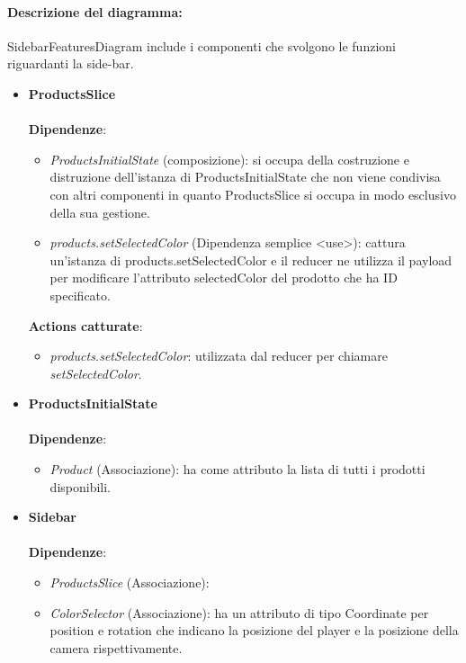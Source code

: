 	\paragraph*{Descrizione del diagramma:}
	SidebarFeaturesDiagram include i componenti che svolgono le funzioni riguardanti la side-bar.
\begin{itemize}
		\item \textbf{ProductsSlice}
		\\\\
		\textbf{Dipendenze}:
		\begin{itemize}
			\item \textit{ProductsInitialState} (composizione): si occupa della costruzione e distruzione dell'istanza di ProductsInitialState
			che non viene condivisa con altri componenti in quanto ProductsSlice si occupa in modo esclusivo della sua gestione.
			\item \textit{products.setSelectedColor} (Dipendenza semplice \textless use\textgreater): cattura un'istanza di products.setSelectedColor e il 
			reducer ne utilizza il payload per modificare l'attributo selectedColor del prodotto che ha ID specificato.
		\end{itemize}
		\textbf{Actions catturate}:
		\begin{itemize}
			\item \textit{products.setSelectedColor}: utilizzata dal reducer per chiamare \textit{setSelectedColor}.
		\end{itemize}
		\item \textbf{ProductsInitialState}
		\\\\
		\textbf{Dipendenze}:
		\begin{itemize}
			\item \textit{Product} (Associazione): ha come attributo la lista di tutti i prodotti disponibili.
		\end{itemize}
		\item \textbf{Sidebar}
		\\\\
		\textbf{Dipendenze}:
		\begin{itemize}
			\item \textit{ProductsSlice} (Associazione):
			\item \textit{ColorSelector} (Associazione): ha un attributo di tipo Coordinate per position e rotation che indicano la posizione del player e la 
			posizione della camera rispettivamente.
		\end{itemize}

\end{itemize}
